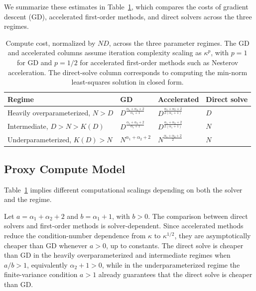 \documentclass[11pt]{article}
\renewcommand{\arraystretch}{2}
\theoremstyle{plain}
\theoremstyle{definition}
\theoremstyle{remark}
\begin{document}
We summarize these estimates in Table~\ref{tab:threeRegimes}, which compares the costs of gradient descent (GD), accelerated first-order methods, and direct solvers across the three regimes.
\begin{table}[H]
\vspace{-4mm}
    \centering
    \caption{Compute cost, normalized by $ND$, across the three parameter regimes. The GD and accelerated columns assume iteration complexity scaling as $\kappa^p$, with $p=1$ for GD and $p=1/2$ for accelerated first-order methods such as Nesterov acceleration. The direct-solve column corresponds to computing the min-norm least-squares solution in closed form.}
    \label{tab:threeRegimes}
    \small
    \setlength{\tabcolsep}{4pt}
    \renewcommand{\arraystretch}{1.15}
    \begin{tabularx}{\columnwidth}{
        >{\hsize=0.8\hsize\centering\arraybackslash}X
        >{\hsize=0.4\hsize\centering\arraybackslash}X
        >{\hsize=0.4\hsize\centering\arraybackslash}X
        >{\hsize=0.4\hsize\centering\arraybackslash}X
        }
        \toprule
         Regime 
         & GD 
         & Accelerated 
         & Direct solve \\
         \midrule
         Heavily overparameterized, $N>D$ 
         & $D^{\frac{\alpha_1+\alpha_2+2}{\alpha_1+1}}$ 
         & $D^{\frac{\alpha_1+\alpha_2+2}{2(\alpha_1+1)}}$ 
         & $D$ \\
         Intermediate, $D>N>K(D)$ 
         & $D^{\frac{\alpha_1+\alpha_2+2}{\alpha_1+1}}$ 
         & $D^{\frac{\alpha_1+\alpha_2+2}{2(\alpha_1+1)}}$ 
         & $N$ \\
         Underparameterized, $K(D)>N$ 
         & $N^{\alpha_1+\alpha_2+2}$ 
         & $N^{\frac{\alpha_1+\alpha_2+2}{2}}$ 
         & $N$ \\
         \bottomrule
    \end{tabularx}
\end{table}

\subsection{Proxy Compute Model}

Table~\ref{tab:threeRegimes} implies different computational scalings depending on both the solver and the regime.

Let $a=\alpha_1+\alpha_2+2$ and $b=\alpha_1+1$, with $b>0$. The comparison between direct solvers and first-order methods is solver-dependent. Since accelerated methods reduce the condition-number dependence from $\kappa$ to $\kappa^{1/2}$, they are asymptotically cheaper than GD whenever $a>0$, up to constants. The direct solve is cheaper than GD in the heavily overparameterized and intermediate regimes when $a/b>1$, equivalently $\alpha_2+1>0$, while in the underparameterized regime the finite-variance condition $a>1$ already guarantees that the direct solve is cheaper than GD.
\end{document}
